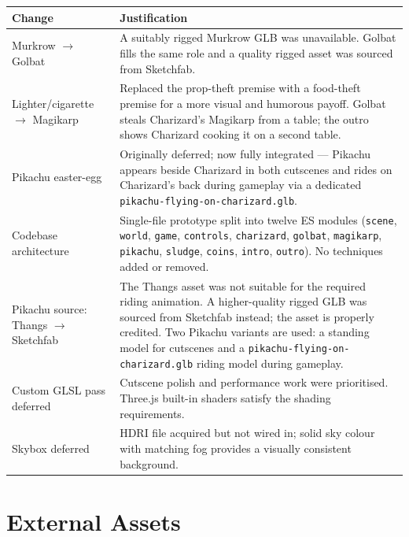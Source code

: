 \documentclass[11pt,a4paper]{article}
\begin{document}
\begin{tabular}{@{} L{4cm} L{10cm} @{}}
\toprule
\textbf{Change} & \textbf{Justification} \\
\midrule
Murkrow \(\rightarrow\) Golbat
  & A suitably rigged Murkrow GLB was unavailable. Golbat fills the same
    role and a quality rigged asset was sourced from Sketchfab. \\[4pt]
Lighter/cigarette \(\rightarrow\) Magikarp
  & Replaced the prop-theft premise with a food-theft premise for a more
    visual and humorous payoff. Golbat steals Charizard's Magikarp from a
    table; the outro shows Charizard cooking it on a second table. \\[4pt]
Pikachu easter-egg
  & Originally deferred; now fully integrated --- Pikachu appears beside
    Charizard in both cutscenes and rides on Charizard's back during
    gameplay via a dedicated \texttt{pikachu-flying-on-charizard.glb}. \\[4pt]
Codebase architecture
  & Single-file prototype split into twelve ES modules
    (\texttt{scene}, \texttt{world}, \texttt{game}, \texttt{controls},
    \texttt{charizard}, \texttt{golbat}, \texttt{magikarp}, \texttt{pikachu},
    \texttt{sludge}, \texttt{coins}, \texttt{intro}, \texttt{outro}).
    No techniques added or removed. \\[4pt]
Pikachu source: Thangs $\rightarrow$ Sketchfab
  & The Thangs asset was not suitable for the required riding animation.
    A higher-quality rigged GLB was sourced from Sketchfab instead;
    the asset is properly credited. Two Pikachu variants are used:
    a standing model for cutscenes and a
    \texttt{pikachu-flying-on-charizard.glb} riding model during gameplay. \\[4pt]
Custom GLSL pass deferred
  & Cutscene polish and performance work were prioritised. Three.js built-in
    shaders satisfy the shading requirements. \\[4pt]
Skybox deferred
  & HDRI file acquired but not wired in; solid sky colour with matching fog
    provides a visually consistent background. \\
\bottomrule
\end{tabular}

\section{External Assets}
\end{document}
